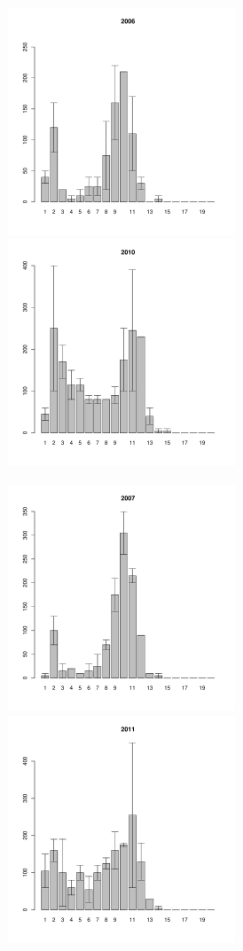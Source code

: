 \documentclass[12pt, a4paper]{article}
\begin{document}
\begin{figure}[h]

\begin{multicols}{3}
\hfill
\includegraphics[width=60mm]{../White_Sea/Ryashkov_ZRS/zrs_2006_.pdf}
\hfill
\includegraphics[width=60mm]{../White_Sea/Ryashkov_ZRS/zrs_2010_.pdf}
\hfill

\end{multicols}



\begin{multicols}{3}
\hfill
\includegraphics[width=60mm]{../White_Sea/Ryashkov_ZRS/zrs_2007_.pdf}
\hfill
\includegraphics[width=60mm]{../White_Sea/Ryashkov_ZRS/zrs_2011_.pdf}
\hfill


\end{multicols}
\end{figure}
\end{document}
